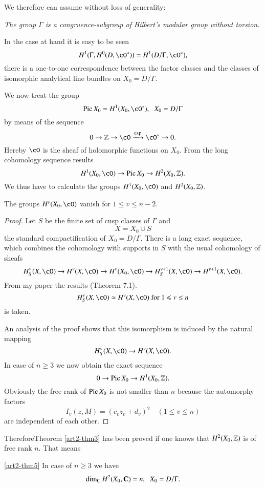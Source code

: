 We therefore can assume without loss of generality:

\textit{The group $\Gamma$ is a congruence-subgroup of Hilbert's modular group without torsion.}

In the case at hand it is easy to be seen
$$
H^1 (\Gamma, H^0 (D, \cO^\ast)) = H^1 (D/ \Gamma, \cO^\ast),
$$
\ie there is a one-to-one correspondence between the factor classes and the classes of isomorphic analytical line bundles on $X_0 = D/\Gamma$.

We now treat the group
$$
\Pic X_0 = H^1 (X_0, \cO^\ast), \;\; X_0 = D/ \Gamma
$$
by means of the sequence
$$
0 \to \bZ \to \cO  \xrightarrow{\exp} \cO^\ast \to 0.
$$
Hereby $\cO$ is the sheaf of holomorphic functions on $X_0$. From the long cohomology sequence results
$$
H^1 (X_0, \cO) \to \Pic X_0 \to H^2 (X_0, \bZ).
$$
We thus have to calculate the groups $H^1 (X_0, \cO)$ and $H^2 (X_0, \mathbb{Z})$.

\begin{thm}\label{art2-thm4}
The groups $H^v (X_0, \cO)$ vanish for $1 \leqslant v \leqslant n -2$.
\end{thm}

\begin{proof}
Let $S$ be the finite set of cusp classes of $\Gamma$ and 
$$
X = X_0 \cup S
$$
the standard compactification of $X_0 = D/\Gamma$. There is a long exact sequence, which combines the cohomology with supports in $S$ with the usual cohomology of sheafs
$$
H^v_S (X, \cO) \to H^v (X, \cO) \to H^v (X_0, \cO) \to H^{v+1}_S  (X, \cO) \to H^{v+1} (X,\cO).
$$
From my paper \cite{art2-key1} the results (Theorem 7.1).
$$
H^v_S (X, \cO) \simeq H^v (X, \cO) \text{ for } 1 \leqslant v \leq n
$$
is taken.

An analysis of the proof shows that this isomorphism is induced by the natural mapping 
$$
H^v_S (X, \cO) \to H^v (X, \cO).
$$
In case of $n \geqslant 3$ we now obtain the exact sequence
$$
0 \to \operatorname{Pic} X_0 \to H^1 (X_0, \mathbb{Z}).
$$
Obviously the free rank of $\operatorname{Pic} X_0$ is not smaller than $n$ because the automorphy factors
$$
I_v (z, M) = (c_v z_v + d_v)^2 \quad (1 \leqslant v \leqslant n)
$$
are independent of each other.
\end{proof}

Therefore\pageoriginale Theorem \ref{art2-thm3} has been proved if one knows that $H^2 (X_0, \mathbb{Z})$ is of free rank $n$. That means

\begin{thm}\ref{art2-thm5}
In case of $n \geqslant 3$ we have
$$
\dim_{\mathbf{C}} H^2 (X_0, \mathbf{C}) = n, \;\; X_0 = D/\Gamma.
$$ 
\end{thm}

